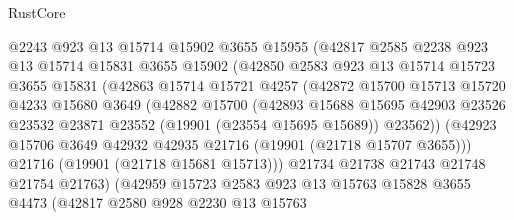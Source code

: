 \begin{lexlean}{RustCore}
\begin{coremodule}
                    @2243
                    @923
                    @13
                    @15714
                    @15902
                    @3655
                    @15955
                    (@42817
                      @2585
                      @2238
                      @923
                      @13
                      @15714
                      @15831
                      @3655
                      @15902
                      (@42850
                        @2583
                        @923
                        @13
                        @15714
                        @15723
                        @3655
                        @15831
                        (@42863
                          @15714
                          @15721
                          @4257
                          (@42872
                            @15700
                            @15713
                            @15720
                            @4233
                            @15680
                            @3649
                            (@42882
                              @15700
                              (@42893
                                @15688
                                @15695
                                @42903
                                @23526
                                @23532
                                @23871
                                @23552
                                (@19901 (@23554 @15695 @15689))
                                @23562))
                            (@42923
                              @15706
                              @3649
                              @42932
                              @42935
                              @21716
                              (@19901 (@21718 @15707 @3655)))
                            @21716
                            (@19901 (@21718 @15681 @15713)))
                          @21734
                          @21738
                          @21743
                          @21748
                          @21754
                          @21763)
                        (@42959
                          @15723
                          @2583
                          @923
                          @13
                          @15763
                          @15828
                          @3655
                          @4473
                          (@42817
                            @2580
                            @928
                            @2230
                            @13
                            @15763

\end{coremodule}
\end{lexlean}
